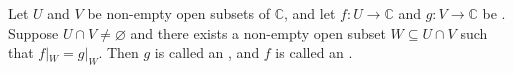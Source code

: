 \begin{definition} \label{definition:analytic_continuation_of_a_holomorphic_function_on_an_open_subset_of_the_complex_plane}
Let $U$ and $V$ be non-empty open subsets of $\mathbb{C}$, and let $f: U \to \mathbb{C}$ and $g: V \to \mathbb{C}$ be . Suppose $U \cap V \neq \varnothing$ and there exists a non-empty open subset $W \subseteq U \cap V$ such that $f|_W = g|_W$. Then $g$ is called an , and $f$ is called an .
\end{definition}
